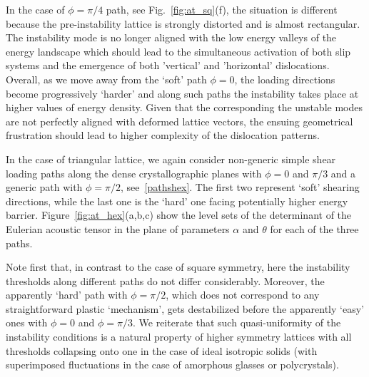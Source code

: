 \documentclass[CRPHYS,Unicode,manuscript]{cedram}
\begin{document}
  In the case of $\phi=\pi/4$ path, see Fig.~\ref{fig:at_sq}(f), the situation is different because the pre-instability lattice is strongly distorted and is almost rectangular. The  instability mode is no longer aligned with the  low energy valleys of the energy landscape which should lead to the simultaneous activation of both  slip systems and the emergence of both 'vertical' and 'horizontal' dislocations.   Overall, as we move away from  the `soft' path $\phi=0$, the  loading directions become progressively  `harder'  and  along such paths the instability takes place at higher values of energy density.  Given that  the corresponding  the unstable modes are  not perfectly aligned with deformed lattice vectors,  the ensuing geometrical frustration should lead to higher complexity of the  dislocation patterns. 




In the case of triangular lattice, we again consider non-generic  simple shear loading paths along the dense crystallographic planes with  $\phi=0$ and $\pi/3$  and  a generic path  with $\phi=\pi/2$, see~\eqref{pathshex}. The first  two   represent  `soft' shearing directions, while the last one is the  `hard'  one  facing potentially higher energy barrier.  Figure~\ref{fig:at_hex}(a,b,c)  show the level sets  of the determinant of the Eulerian acoustic tensor  in the plane of parameters  $\alpha$ and  $\theta$  for  each of the three paths.  

Note first that,  in contrast to the case of   square symmetry,   here  the instability thresholds  along different paths do not differ considerably.  Moreover, the apparently `hard' path with $\phi=\pi/2$, which does not correspond to any  straightforward  plastic `mechanism', gets destabilized before the apparently  `easy' ones with $\phi=0$ and $\phi=\pi/3$. We reiterate  that such quasi-uniformity  of the instability conditions  is a natural property  of higher symmetry lattices with all   thresholds  collapsing onto one in the case of ideal isotropic solids (with superimposed fluctuations in the case of amorphous glasses or polycrystals).
\end{document}
